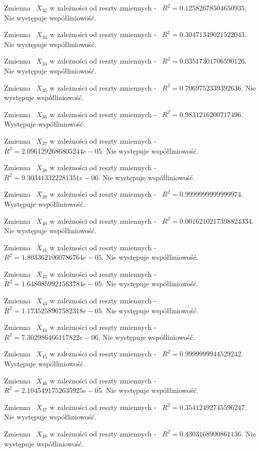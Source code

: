 \documentclass{article}
\begin{document}
Zmienna ~$X_{32}$ w zależności od reszty zmiennych - ~$R^2 = 0.12582678504650935$.
Nie występuje współliniowość.

Zmienna ~$X_{33}$ w zależności od reszty zmiennych - ~$R^2 = 0.30471349021522043$.
Nie występuje współliniowość.

Zmienna ~$X_{34}$ w zależności od reszty zmiennych - ~$R^2 = 0.03517301706590126$.
Nie występuje współliniowość.

Zmienna ~$X_{35}$ w zależności od reszty zmiennych - ~$R^2 = 0.7069752339392636$.
Nie występuje współliniowość.

Zmienna ~$X_{36}$ w zależności od reszty zmiennych - ~$R^2 = 0.9831216200717496$.
Występuje współliniowość.

Zmienna ~$X_{37}$ w zależności od reszty zmiennych - ~$R^2 = 2.0961292686805244e-05$.
Nie występuje współliniowość.

Zmienna ~$X_{38}$ w zależności od reszty zmiennych - ~$R^2 = 9.303413322281351e-06$.
Nie występuje współliniowość.

Zmienna ~$X_{39}$ w zależności od reszty zmiennych - ~$R^2 = 0.9999999999999974$.
Występuje współliniowość.

Zmienna ~$X_{40}$ w zależności od reszty zmiennych - ~$R^2 = 0.0016210217398824334$.
Nie występuje współliniowość.

Zmienna ~$X_{41}$ w zależności od reszty zmiennych - ~$R^2 = 1.8033621060786764e-05$.
Nie występuje współliniowość.

Zmienna ~$X_{42}$ w zależności od reszty zmiennych - ~$R^2 = 1.6480859921563784e-05$.
Nie występuje współliniowość.

Zmienna ~$X_{43}$ w zależności od reszty zmiennych - ~$R^2 = 1.1735258967582318e-05$.
Nie występuje współliniowość.

Zmienna ~$X_{44}$ w zależności od reszty zmiennych - ~$R^2 = 7.302986466117822e-06$.
Nie występuje współliniowość.

Zmienna ~$X_{45}$ w zależności od reszty zmiennych - ~$R^2 = 0.9999999944529242$.
Występuje współliniowość.

Zmienna ~$X_{46}$ w zależności od reszty zmiennych - ~$R^2 = 2.1045491752635925e-05$.
Nie występuje współliniowość.

Zmienna ~$X_{47}$ w zależności od reszty zmiennych - ~$R^2 = 0.35412492745596247$.
Nie występuje współliniowość.

Zmienna ~$X_{48}$ w zależności od reszty zmiennych - ~$R^2 = 0.4303168900861136$.
Nie występuje współliniowość.
\end{document}
